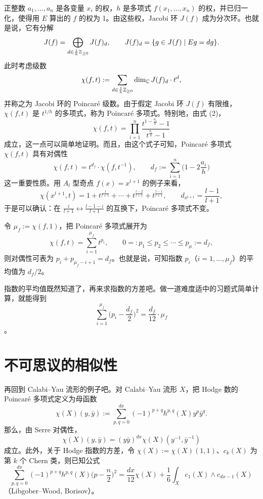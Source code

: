 正整数 $a_1,\dots,a_n$ 是各变量 $x_i$ 的权，$h$ 是多项式 $f(x_1,\dots,x_n)$ 的权，并已归一化，使得用 $E$ 算出的 $f$ 的权为 1。由这些权，Jacobi 环 $J(f)$ 成为分次环。也就是说，它有分解
%
\[
  J(f)=\bigoplus_{d\in\frac{1}{h}\mathbb{Z}_{\ge 0}}J(f)_d,\qquad
  J(f)_d=\{g\in J(f)\mid Eg=dg\}.
\]
%
此时考虑级数
%
\[
  \chi(f,t):=\sum_{d\in\frac{1}{h}\mathbb{Z}_{\ge 0}}\dim_{\mathbb{C}}J(f)_d\cdot t^{d},
\]
%
并称之为 Jacobi 环的 Poincaré 级数。由于假定 Jacobi 环 $J(f)$ 有限维，$\chi(f,t)$ 是 $t^{1/h}$ 的多项式，称为 Poincaré 多项式。特别地，由式 (2)，
\[
  \chi(f,t)=\prod_{i=1}^{n}\frac{t^{1-\frac{a_i}{h}}-1}{t^{\frac{a_i}{h}}-1}
\]
%
成立，这一点可以简单地证明。而且，由这个式子可知，Poincaré 多项式 $\chi(f,t)$ 具有对偶性
%
\[
  \chi(f,t)=t^{d_f}\cdot\chi(f,t^{-1}),\qquad
  d_f:=\sum_{i=1}^{n}\Big(1-2\frac{a_i}{h}\Big)
\]
%
这一重要性质。用 $A_l$ 型奇点 $f(x)=x^{l+1}$ 的例子来看，
%
\[
  \chi(x^{l+1},t)=1+t^{\frac{1}{l+1}}+\cdots+t^{\frac{l-2}{l+1}}+t^{\frac{l-1}{l+1}},\qquad
  d_{x^{l+1}}=\frac{l-1}{l+1},
\]
%
于是可以确认：在 $\frac{i}{l+1}\leftrightarrow\frac{l-1-i}{l+1}$ 的互换下，Poincaré 多项式不变。

令 $\mu_f:=\chi(f,1)$，把 Poincaré 多项式展开为
%
\[
  \chi(f,t)=\sum_{i=1}^{\mu_f}t^{p_i},\qquad 0=:p_1\le p_2\le\cdots\le p_{\mu}:=d_f,
\]
%
则对偶性可表为 $p_i+p_{\mu_f-i+1}=d_f$。也就是说，可知指数 $p_i$（$i=1,\dots,\mu_f$）的平均值为 $d_f/2$。

指数的平均值既然知道了，再来求指数的方差吧。做一道难度适中的习题式简单计算，就能得到
%
\begin{equation}
  \sum_{i=1}^{\mu_f}\Big(p_i-\frac{d_f}{2}\Big)^2=\frac{d_f}{12}\cdot\mu_f
  \tag{3}
\end{equation}
%
。

\section{不可思议的相似性}

再回到 Calabi--Yau 流形的例子吧。对 Calabi--Yau 流形 $X$，把 Hodge 数的 Poincaré 多项式定义为母函数
%
\[
  \chi(X)(y,\bar y):=\sum_{p,q=0}^{dx}(-1)^{p+q}h^{p,q}(X)y^{p}\bar y^{q}.
\]
%
那么，由 Serre 对偶性，
\[
  \chi(X)(y,\bar y)=(y\bar y)^{dx}\chi(X)(y^{-1},\bar y^{-1})
\]
%
成立。此外，关于 Hodge 指数的方差，令 $\chi(X):=\chi(X)(1,1)$、$c_k(X)$ 为第 $k$ 个 Chern 类，则已知公式
%
\begin{equation}
  \sum_{p,q=0}^{dx}(-1)^{p+q}h^{p,q}(X)\Big(p-\frac{n}{2}\Big)^2
  =\frac{dx}{12}\chi(X)+\frac{1}{6}\int_X c_1(X)\wedge c_{dx-1}(X)
  \tag{4}
\end{equation}
%
（Libgober--Wood, Borisov）。%



